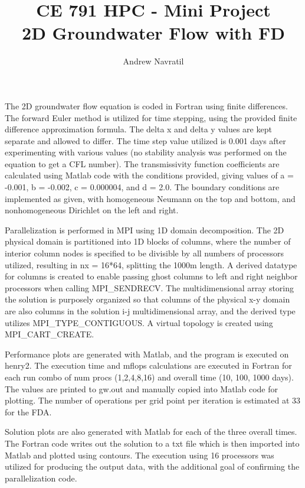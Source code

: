 \documentclass[conf]{new-aiaa}
\title{CE 791 HPC - Mini Project\\2D Groundwater Flow with FD}
\author{Andrew Navratil}
\begin{document}
\maketitle

The 2D groundwater flow equation is coded in Fortran using finite differences.  The forward Euler method is utilized for time stepping, using the provided finite difference approximation formula.  The delta x and delta y values are kept separate and allowed to differ.  The time step value utilized is 0.001 days after experimenting with various values (no stability analysis was performed on the equation to get a CFL number).  The transmissivity function coefficients are calculated using Matlab code with the conditions provided, giving values of a = -0.001, b = -0.002, c = 0.000004, and d = 2.0.  The boundary conditions are implemented as given, with homogeneous Neumann on the top and bottom, and nonhomogeneous Dirichlet on the left and right.

Parallelization is performed in MPI using 1D domain decomposition.  The 2D physical domain is partitioned into 1D blocks of columns, where the number of interior column nodes is specified to be divisible by all numbers of processors utilized, resulting in nx = 16*64, splitting the 1000m length.  A derived datatype for columns is created to enable passing ghost columns to left and right neighbor processors when calling MPI\_SENDRECV.  The multidimensional array storing the solution is purposely organized so that columns of the physical x-y domain are also columns in the solution i-j multidimensional array, and the derived type utilizes MPI\_TYPE\_CONTIGUOUS.  A virtual topology is created using MPI\_CART\_CREATE.

Performance plots are generated with Matlab, and the program is executed on henry2.  The execution time and mflops calculations are executed in Fortran for each run combo of num procs (1,2,4,8,16) and overall time (10, 100, 1000 days).  The values are printed to gw.out and manually copied into Matlab code for plotting.  The number of operations per grid point per iteration is estimated at 33 for the FDA.

Solution plots are also generated with Matlab for each of the three overall times.  The Fortran code writes out the solution to a txt file which is then imported into Matlab and plotted using contours.  The execution using 16 processors was utilized for producing the output data, with the additional goal of confirming the parallelization code.
\end{document}
